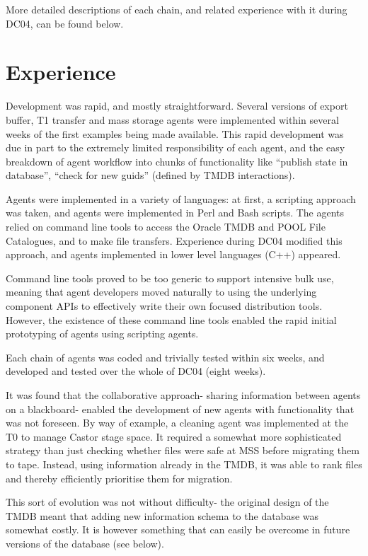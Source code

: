\documentclass{cmspaper}
\begin{document}
More detailed descriptions of each chain, and related experience with
it during DC04, can be found below.

\section{Experience}
Development was rapid, and mostly straightforward. Several versions of
export buffer, T1 transfer and mass storage agents were implemented
within several weeks of the first examples being made available. This
rapid development was due in part to the extremely limited
responsibility of each agent, and the easy breakdown of agent workflow
into chunks of functionality like ``publish state in database'',
``check for new guids'' (defined by TMDB interactions).

Agents were implemented in a variety of languages: at first, a
scripting approach was taken, and agents were implemented in Perl and
Bash scripts. The agents relied on command line tools to access the
Oracle TMDB and POOL File Catalogues, and to make file
transfers. Experience during DC04 modified this approach, and agents
implemented in lower level languages (C++) appeared.

Command line tools proved to be too generic to support intensive bulk
use, meaning that agent developers moved naturally to using the
underlying component APIs to effectively write their own focused
distribution tools. However, the existence of these command line tools
enabled the rapid initial prototyping of agents using scripting
agents.

Each chain of agents was coded and trivially tested within six weeks,
and developed and tested over the whole of DC04 (eight weeks).

It was found that the collaborative approach- sharing information
between agents on a blackboard- enabled the development of new agents
with functionality that was not foreseen. By way of example, a
cleaning agent was implemented at the T0 to manage Castor stage
space. It required a somewhat more sophisticated strategy than just
checking whether files were safe at MSS before migrating them to
tape. Instead, using information already in the TMDB, it was able to
rank files and thereby efficiently prioritise them for migration.

This sort of evolution was not without difficulty- the original design
of the TMDB meant that adding new information schema to the database
was somewhat costly. It is however something that can easily be
overcome in future versions of the database (see below).
\end{document}
